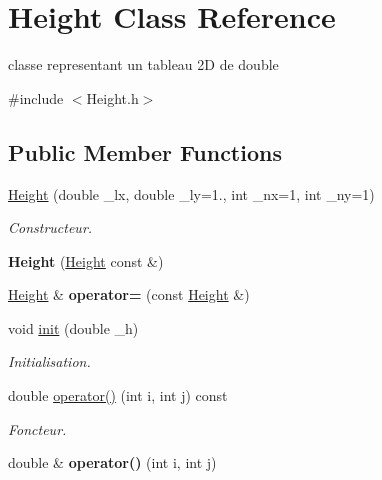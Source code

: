 \hypertarget{class_height}{}\section{Height Class Reference}
\label{class_height}


classe representant un tableau 2D de double  




{\ttfamily \#include $<$Height.\+h$>$}

\subsection*{Public Member Functions}
\begin{DoxyCompactItemize}
\item 
\hyperlink{class_height_ae7df55c82f2a3fbe8e1379c4dd003eef}{Height} (double \+\_\+lx, double \+\_\+ly=1., int \+\_\+nx=1, int \+\_\+ny=1)
\begin{DoxyCompactList}\small\item\em Constructeur. \end{DoxyCompactList}\item 
\hypertarget{class_height_a5aa949bbcd362e4d59fc9d720cf331c6}{}\label{class_height_a5aa949bbcd362e4d59fc9d720cf331c6} 
{\bfseries Height} (\hyperlink{class_height}{Height} const \&)
\item 
\hypertarget{class_height_a1b1db960b77740c413c482dd243a7172}{}\label{class_height_a1b1db960b77740c413c482dd243a7172} 
\hyperlink{class_height}{Height} \& {\bfseries operator=} (const \hyperlink{class_height}{Height} \&)
\item 
void \hyperlink{class_height_a7df615193a661a7f117a56c716e6189e}{init} (double \+\_\+h)
\begin{DoxyCompactList}\small\item\em Initialisation. \end{DoxyCompactList}\item 
double \hyperlink{class_height_a8d2a8c6f51eae0a1382a1557bad13faf}{operator()} (int i, int j) const
\begin{DoxyCompactList}\small\item\em Foncteur. \end{DoxyCompactList}\item 
\hypertarget{class_height_a8270b4bfbb2d5ef5ea256316dd309dbc}{}\label{class_height_a8270b4bfbb2d5ef5ea256316dd309dbc} 
double \& {\bfseries operator()} (int i, int j)
\item 
\hypertarget{class_height_aaa081f8f3456675762b3d74ded8ea026}{}\label{class_height_aaa081f8f3456675762b3d74ded8ea026} 

\end{DoxyCompactItemize}
